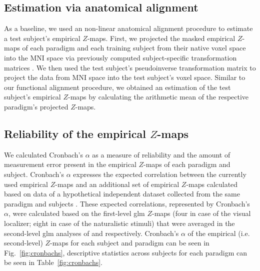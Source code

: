 \subsection{Estimation via anatomical alignment}
%
As a baseline, we used an non-linear anatomical alignment procedure to estimate
a test subject's empirical $Z$-maps.
%
First, we projected the masked empirical $Z$-maps of each paradigm and each
training subject from their native voxel space into the MNI space via previously
computed subject-specific transformation matrices
\citep[][\href{https://github.com/psychoinformatics-de/studyforrest-data-templatetransforms}{\url{github.com/psychoinformatics-de/studyforrest-data-templatetransforms}}]{hanke2014audiomovie}.
We then used the test subject's pseudoinverse transformation matrix to project
the data from MNI space into the test subject's voxel space.
Similar to our functional alignment procedure, we obtained an estimation of the
test subject's empirical $Z$-maps by calculating the arithmetic mean of the
respective paradigm's projected $Z$-maps.



\subsection{Reliability of the empirical $Z$-maps}


%
We calculated Cronbach's $\alpha$ as a measure of reliability and the amount of
measurement error \citep{cronbach1951coefficient, cortina1993coefficient}
present in the empirical $Z$-maps of each paradigm and subject.
%
Cronbach's $\alpha$ expresses the expected correlation between the currently
used empirical $Z$-maps and an additional set of empirical $Z$-maps calculated
based on data of a hypothetical independent dataset collected from the same
paradigm and subjects \citep{jiahui2020predicting, jiahui2022cross}.
%
These expected correlations, represented by Cronbach's $\alpha$, were calculated
based on the first-level \ac{glm} $Z$-maps (four in case of the visual
localizer; eight in case of the naturalistic stimuli) that were averaged in the
second-level \ac{glm} analyses of \citet{sengupta2016extension} and
\citet{haeusler2022processing} respectively.
%
Cronbach's $\alpha$ of the empirical (i.e. second-level) $Z$-maps for each
subject and paradigm can be seen in Fig.~\ref{fig:cronbachs}, descriptive
statistics across subjects for each paradigm can be seen in
Table~\ref{fig:cronbachs}.

